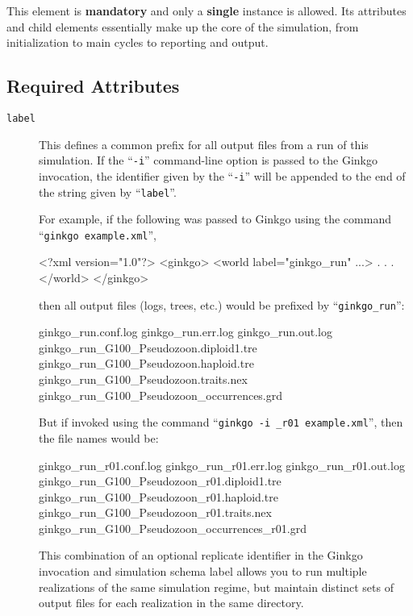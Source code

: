 \documentclass[11pt]{article}
\newcommand{\xmlattr}[1]{{\tt\textcolor{xmlattr}{#1}}}
\begin{document}
This element is \textbf{mandatory} and only a \textbf{single} instance is allowed.
Its attributes and child elements essentially make up the core of the simulation, from initialization to main cycles to reporting and output.

\subsection{Required Attributes}
\begin{description}

	\item[\xmlattr{label}] This defines a common prefix for all output files from a run of this simulation. If the ``\verb=-i='' command-line option is passed to the Ginkgo invocation, the identifier given by the ``\verb=-i='' will be appended to the end of the string given by ``\verb=label=''.

	For example, if the following was passed to Ginkgo using the command ``\verb=ginkgo example.xml='',

	\begin{ginkgoxml}
<?xml version="1.0"?>
<ginkgo>
    <world label="ginkgo_run" ...>
	.
	.
	.
    </world>
</ginkgo>
	\end{ginkgoxml}

then all output files (logs, trees, etc.) would be prefixed by ``\verb=ginkgo_run='':

\begin{shell}
ginkgo_run.conf.log
ginkgo_run.err.log
ginkgo_run.out.log
ginkgo_run_G100_Pseudozoon.diploid1.tre
ginkgo_run_G100_Pseudozoon.haploid.tre
ginkgo_run_G100_Pseudozoon.traits.nex
ginkgo_run_G100_Pseudozoon_occurrences.grd
\end{shell}

But if invoked using the command ``\verb=ginkgo -i _r01 example.xml='', then the file names would be:

\begin{shell}
ginkgo_run_r01.conf.log
ginkgo_run_r01.err.log
ginkgo_run_r01.out.log
ginkgo_run_G100_Pseudozoon_r01.diploid1.tre
ginkgo_run_G100_Pseudozoon_r01.haploid.tre
ginkgo_run_G100_Pseudozoon_r01.traits.nex
ginkgo_run_G100_Pseudozoon_occurrences_r01.grd
\end{shell}

This combination of an optional replicate identifier in the Ginkgo invocation and simulation schema label allows you to run multiple realizations of the same simulation regime, but maintain distinct sets of output files for each realization in the same directory.


\end{description}
\end{document}
